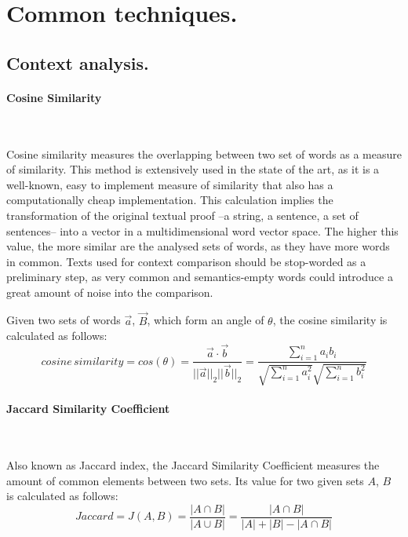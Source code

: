 \section{Common techniques.}
\label{sec:techniques}

\subsection{Context analysis.}
\label{sec:techniques:context}

\paragraph{Cosine Similarity}~

Cosine similarity measures the overlapping between two set of words as a measure of similarity. This method is extensively used in the state of the art, as it is a well-known, easy to implement measure of similarity that also has a computationally cheap implementation. This calculation implies the transformation of the original textual proof --a string, a sentence, a set of sentences-- into a vector in a multidimensional word vector space. The higher this value, the more similar are the analysed sets of words, as they have more words in common. Texts used for context comparison should be stop-worded as a preliminary step, as very common and semantics-empty words could introduce a great amount of noise into the comparison.

Given two sets of words $\vec{a}$, $\vec{B}$, which form an angle of $\theta$, the cosine similarity is calculated as follows:
%
\begin{equation}
cosine\,similarity = cos(\theta) = \frac{\vec{a} \cdot \vec{b}}{||\vec{a}||_2 ||\vec{b}||_2} = \frac{\sum^n_{i=1} a_i b_i}{\sqrt{\sum^n_{i=1} a_i^2}\sqrt{\sum^n_{i=1} b_i^2}}
\label{eq:cosine}
\end{equation}

\paragraph{Jaccard Similarity Coefficient}~

Also known as Jaccard index, the Jaccard Similarity Coefficient measures the amount of common elements between two sets. Its value for two given sets $A$, $B$ is calculated as follows:
%
\begin{equation}
Jaccard = J(A,B) = \frac{|A \cap B|}{|A \cup B|} = \frac{|A \cap B|}{|A| + |B| - |A \cap B|}
\label{eq:jaccard}
\end{equation}

